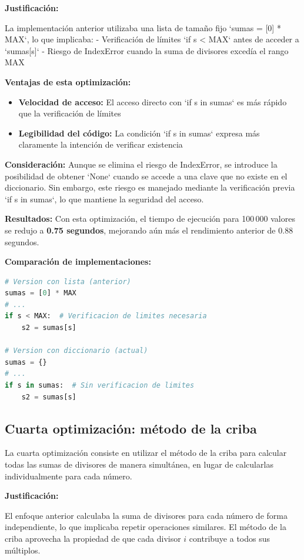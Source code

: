 \textbf{Justificación:} 

La implementación anterior utilizaba una lista de tamaño fijo `sumas = [0] * MAX`, lo que implicaba:
- Verificación de límites `if s < MAX` antes de acceder a `sumas[s]`
- Riesgo de IndexError cuando la suma de divisores excedía el rango MAX

\textbf{Ventajas de esta optimización:}

\begin{itemize}
    \item \textbf{Velocidad de acceso:} El acceso directo con `if s in sumas` es más rápido que la verificación de límites
    \item \textbf{Legibilidad del código:} La condición `if s in sumas` expresa más claramente la intención de verificar existencia
\end{itemize}

\textbf{Consideración:} Aunque se elimina el riesgo de IndexError, se introduce la posibilidad de obtener `None` cuando se accede a una clave que no existe en el diccionario. Sin embargo, este riesgo es manejado mediante la verificación previa `if s in sumas`, lo que mantiene la seguridad del acceso.

\textbf{Resultados:} Con esta optimización, el tiempo de ejecución para 100\,000 valores se redujo a \textbf{0.75 segundos}, mejorando aún más el rendimiento anterior de 0.88 segundos.

\textbf{Comparación de implementaciones:}

\begin{lstlisting}[language=Python]
# Version con lista (anterior)
sumas = [0] * MAX
# ...
if s < MAX:  # Verificacion de limites necesaria
    s2 = sumas[s]

# Version con diccionario (actual)
sumas = {}
# ...
if s in sumas:  # Sin verificacion de limites
    s2 = sumas[s]
\end{lstlisting}

\subsection{Cuarta optimización: método de la criba}

La cuarta optimización consiste en utilizar el método de la criba para calcular todas las sumas de divisores de manera simultánea, en lugar de calcularlas individualmente para cada número.

\textbf{Justificación:} 

El enfoque anterior calculaba la suma de divisores para cada número de forma independiente, lo que implicaba repetir operaciones similares. El método de la criba aprovecha la propiedad de que cada divisor $i$ contribuye a todos sus múltiplos.

